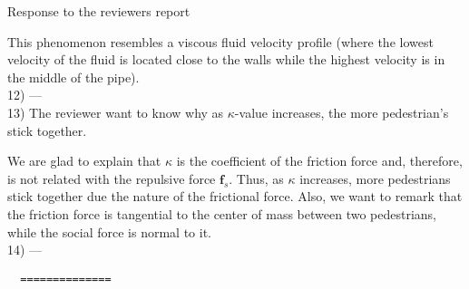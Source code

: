\documentclass[a4paper,12pt]{letter}
\begin{document}
\begin{letter}{Response to the reviewers report}
{This phenomenon resembles a viscous fluid velocity profile (where the lowest velocity of the fluid is located close to the walls while the highest velocity is in the middle of the pipe).  \\

12) --- \\

13) The reviewer want to know why as $\kappa$-value increases, the more 
pedestrian's stick together.

We are glad to explain that $\kappa$ is the coefficient of the 
friction force and, therefore, is not related with the repulsive force 
$\mathbf{f}_s$. Thus, as $\kappa$ increases, more pedestrians stick 
together due the nature of the frictional force. Also, we want to remark that 
the friction force is tangential to the center of mass between two pedestrians, 
while the social force is normal to it. \\

14) ---\\

\iffalse
The Reviewer~\#5 is overall satisfied with our reply about these issues. But, 
he (she) suggests two minor revisions:\\

1) The reviewer points out that the term ``contagion'' is somehow problematic. 
He (she) suggests to either get rid of the ``contagion'' term or write a short 
paragraph in order to clarify our understanding of the term. At the same time, 
the reviewer recognizes that the interpretation of the term ``contagion'' is 
different depending of the field. \\

In order to avoid any misunderstanding of the term ``contagion'' we replaced it 
by ``propagation'' or ``spreading'', as a more appropriate one throughout the 
manuscript. \\

Again, we want to thanks the Reviewer~\#5 for his (her) comments and his 
(her) recommendation of the Human Crowd Dynamics Glossary. \\

2) We examined the recommended work by A. R. Mawson (2005) and corrected our 
misunderstanding. The revised version (second paragraph of Section 1) expresses 
these ideas accurately.   
\fi

\begin{verbatim}
  ==============
\end{verbatim}

}
\end{letter}
\end{document}
